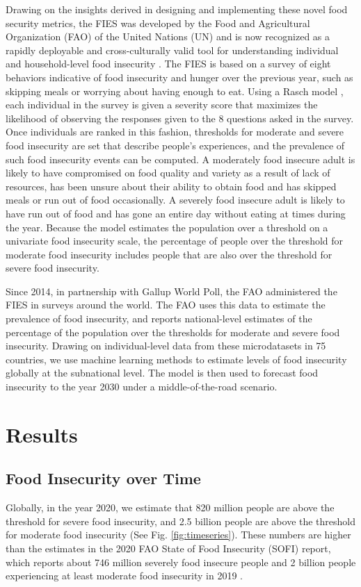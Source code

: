 \documentclass{article}
\begin{document}
Drawing on the insights derived in designing and implementing these novel food security metrics, the FIES was developed by the Food and Agricultural Organization (FAO) of the United Nations (UN) \cite{Ballard2013} and is now recognized as a rapidly deployable and cross-culturally valid tool for understanding individual and household-level food insecurity \citep{wambogo2018validity, smith2017world}.  The FIES is based on a survey of eight behaviors indicative of food insecurity and hunger over the previous year, such as skipping meals or worrying about having enough to eat.  Using a Rasch model \citep{Cafiero2018}, each individual in the survey is given a severity score that maximizes the likelihood of observing the responses given to the 8 questions asked in the survey.  Once individuals are ranked in this fashion, thresholds for moderate and severe food insecurity are set that describe people's experiences, and the prevalence of such food insecurity events can be computed. A moderately food insecure adult is likely to have compromised on food quality and variety as a result of lack of resources, has been unsure about their ability to obtain food and has skipped meals or run out of food occasionally. A severely food insecure adult is likely to have run out of food and has gone an entire day without eating at times during the year.  Because the model estimates the population over a threshold on a univariate food insecurity scale, the percentage of people over the threshold for moderate food insecurity includes people that are also over the threshold for severe food insecurity.

Since 2014, in partnership with Gallup World Poll, the FAO administered the FIES in surveys around the world. The FAO uses this data to estimate the prevalence of food insecurity, and reports national-level estimates of the percentage of the population over the thresholds for moderate and severe food insecurity.  Drawing on individual-level data from these microdatasets in 75 countries, we use machine learning methods to estimate levels of food insecurity globally at the subnational level.  The model is then used to forecast food insecurity to the year 2030 under a middle-of-the-road scenario.

\section{Results}
\subsection{Food Insecurity over Time}
Globally, in the year 2020, we estimate that 820 million people are above the threshold for severe food insecurity, and 2.5 billion people are above the threshold for moderate food insecurity (See Fig. \ref{fig:timeseries}). These numbers are higher than the estimates in the 2020 FAO State of Food Insecurity (SOFI) report, which reports about 746 million severely food insecure people and 2 billion people experiencing at least moderate food insecurity in 2019 \citep{sofi2020}. 
\end{document}
